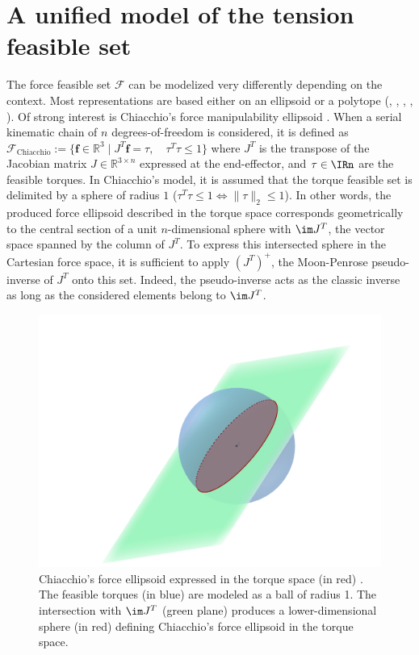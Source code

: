 \chapter{A unified model of the tension feasible set}
\label{chapter:3}

The force feasible set $\mathcal{F}$ can be modelized very differently depending on the context. Most representations are based either on an ellipsoid or a polytope (\cite{skuricOnLineFeasibleWrench2022}, \cite{rezzougUpperLimbIsometricForce2021b}, \cite{laisneGeneticAlgorithmsForce2023}, \cite{hernandezImprovingUpperlimbForce2017a}, \cite{bosscherWrenchfeasibleWorkspaceGeneration2006a}). Of strong interest is Chiacchio's force manipulability ellipsoid \cite{chiacchioForcePolytopeForce1997}. When a serial kinematic chain of $n$ degrees-of-freedom is considered, it is defined as $\mathcal{F}_{\text{Chiacchio}} := \{\mathbf{f}\in\mathbb{R}^3 \mid J^T\mathbf{f} = \tau,\quad \tau^T\tau\leq 1\}$
where $J^T$ is the transpose of the Jacobian matrix $J\in\mathbb{R}^{3\times n}$ expressed at the end-effector, and $\tau\in \IRn$ are the feasible torques. In Chiacchio's model, it is assumed that the torque feasible set is delimited by a sphere of radius $1$ ($\tau^T\tau \leq 1 \iff \|\tau \|_2 \leq 1$). In other words, the produced force ellipsoid described in the torque space corresponds geometrically to the central section of a unit $n$-dimensional sphere with $\im J^T$, the vector space spanned by the column of $J^T$. To express this intersected sphere in the Cartesian force space, it is sufficient to apply $(J^T)^+$, the Moon-Penrose pseudo-inverse of $J^T$ onto this set. Indeed, the pseudo-inverse acts as the classic inverse as long as the considered elements belong to $\im J^T$.

\begin{figure}[!htb]
    \captionsetup{justification=centering}
        \centering
        \includegraphics[trim={80 20 50 120}, clip, width=0.5\linewidth]{img/chapter_3/chiacchioellipsoid.png}
    \caption{Chiacchio's force ellipsoid expressed in the torque space (in red) \cite{chiacchioForcePolytopeForce1997}. The feasible torques (in blue) are modeled as a ball of radius 1. The intersection with $\im J^T$ (green plane) produces a lower-dimensional sphere (in red) defining Chiacchio's force ellipsoid in the torque space.}
    \label{fig:chiacchio_ellispoid}
\end{figure}

